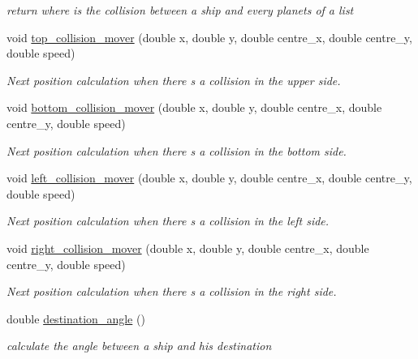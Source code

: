 \begin{DoxyCompactItemize}
\begin{DoxyCompactList}\small\item\em return where is the collision between a ship and every planets of a list \end{DoxyCompactList}\item 
void \hyperlink{classfr_1_1groupe40_1_1projet_1_1model_1_1ships_1_1_ship_aab898b49dfc4d08d3b8ac7b08d936697}{top\+\_\+collision\+\_\+mover} (double x, double y, double centre\+\_\+x, double centre\+\_\+y, double speed)
\begin{DoxyCompactList}\small\item\em Next position calculation when there s a collision in the upper side. \end{DoxyCompactList}\item 
void \hyperlink{classfr_1_1groupe40_1_1projet_1_1model_1_1ships_1_1_ship_a88644a9fdb0c146f6f9ba556326e7122}{bottom\+\_\+collision\+\_\+mover} (double x, double y, double centre\+\_\+x, double centre\+\_\+y, double speed)
\begin{DoxyCompactList}\small\item\em Next position calculation when there s a collision in the bottom side. \end{DoxyCompactList}\item 
void \hyperlink{classfr_1_1groupe40_1_1projet_1_1model_1_1ships_1_1_ship_a2908d837a3d3515380ce728f42b43b52}{left\+\_\+collision\+\_\+mover} (double x, double y, double centre\+\_\+x, double centre\+\_\+y, double speed)
\begin{DoxyCompactList}\small\item\em Next position calculation when there s a collision in the left side. \end{DoxyCompactList}\item 
void \hyperlink{classfr_1_1groupe40_1_1projet_1_1model_1_1ships_1_1_ship_a1e045760991d3d6594a41348128f6bef}{right\+\_\+collision\+\_\+mover} (double x, double y, double centre\+\_\+x, double centre\+\_\+y, double speed)
\begin{DoxyCompactList}\small\item\em Next position calculation when there s a collision in the right side. \end{DoxyCompactList}\item 
double \hyperlink{classfr_1_1groupe40_1_1projet_1_1model_1_1ships_1_1_ship_aba9445d4839238bdb88b4e99229fdd89}{destination\+\_\+angle} ()
\begin{DoxyCompactList}\small\item\em calculate the angle between a ship and his destination \end{DoxyCompactList}\item 

\end{DoxyCompactItemize}
